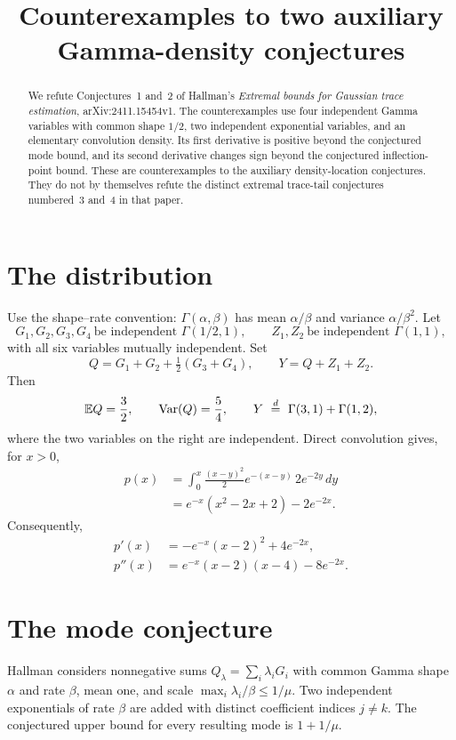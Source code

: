 \documentclass[11pt]{article}
\title{Counterexamples to two auxiliary Gamma-density conjectures}
\author{}
\date{}
\begin{document}
\maketitle
\begin{abstract}
We refute Conjectures~1 and~2 of Hallman's \emph{Extremal bounds for Gaussian trace estimation}, arXiv:2411.15454v1. The counterexamples use four independent Gamma variables with common shape $1/2$, two independent exponential variables, and an elementary convolution density. Its first derivative is positive beyond the conjectured mode bound, and its second derivative changes sign beyond the conjectured inflection-point bound. These are counterexamples to the auxiliary density-location conjectures. They do not by themselves refute the distinct extremal trace-tail conjectures numbered~3 and~4 in that paper.
\end{abstract}

\section{The distribution}
Use the shape--rate convention: $\Gamma(\alpha,\beta)$ has mean $\alpha/\beta$ and variance $\alpha/\beta^2$. Let
\[
 G_1,G_2,G_3,G_4\ \text{be independent }\Gamma(1/2,1),
 \qquad Z_1,Z_2\ \text{be independent }\Gamma(1,1),
\]
with all six variables mutually independent. Set
\begin{equation}\label{eq:QY}
 Q=G_1+G_2+\tfrac12(G_3+G_4),\qquad Y=Q+Z_1+Z_2.
\end{equation}
Then
\[
 \mathbb E Q=\frac32,\qquad \operatorname{Var}(Q)=\frac54,
 \qquad Y\ \stackrel{d}=\ \Gamma(3,1)+\Gamma(1,2),
\]
where the two variables on the right are independent. Direct convolution gives, for $x>0$,
\begin{align}\label{eq:density}
 p(x)&=\int_0^x\frac{(x-y)^2}{2}e^{-(x-y)}\,2e^{-2y}\,dy\\
 &=e^{-x}(x^2-2x+2)-2e^{-2x}.\nonumber
\end{align}
Consequently,
\begin{align}
 p'(x)&=-e^{-x}(x-2)^2+4e^{-2x},\label{eq:first}\\
 p''(x)&=e^{-x}(x-2)(x-4)-8e^{-2x}.\label{eq:second}
\end{align}

\section{The mode conjecture}
Hallman \cite[Theorem~2 and Conjecture~1]{Hallman2024} considers nonnegative sums $Q_\lambda=\sum_i\lambda_iG_i$ with common Gamma shape $\alpha$ and rate $\beta$, mean one, and scale $\max_i\lambda_i/\beta\le1/\mu$. Two independent exponentials of rate $\beta$ are added with distinct coefficient indices $j\ne k$. The conjectured upper bound for every resulting mode is $1+1/\mu$.
\end{document}
